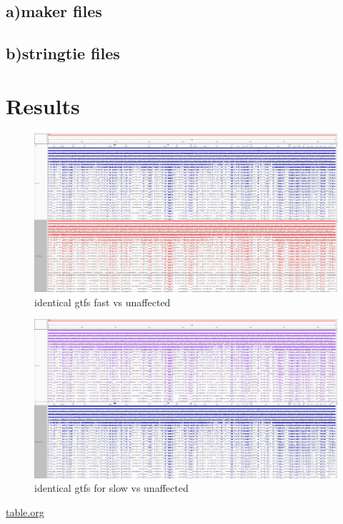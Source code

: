 \documentclass[11pt]{article}
\begin{document}
\subsection{a)maker files}
\label{sec-6-1}
\subsection{b)stringtie files}
\label{sec-6-2}
\section{Results}
\label{sec-7}
\begin{figure}[htb]
\centering
\includegraphics[width=.9\linewidth]{./igv_fast.png}
\caption{\label{fig:igv_fast-vs-unaffected}identical gtfs fast vs unaffected}
\end{figure}

\begin{figure}[htb]
\centering
\includegraphics[width=.9\linewidth]{./igv_slow.png}
\caption{\label{fig:igv_slow-vs-unaffected}identical gtfs for slow vs unaffected}
\end{figure}
\href{./table.org}{table.org}
\end{document}
